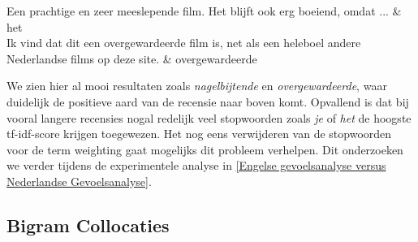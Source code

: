 \begin{table}[h]
\begin{tabu}
Een prachtige en zeer meeslepende film. Het blijft ook erg boeiend, omdat ... & het                                  \\ \hline
Ik vind dat dit een overgewardeerde film is, net als een heleboel andere Nederlandse films op deze site.                                                                                                                                                                                                                                                                                                                                                                                                                                                                                                                                                                                                                                                                                                                                                                                                                                                                                                                                                                                                                                                                                                                                                                                                                                                                                                                                                                                        & overgewardeerde                      \\ \hline
\end{tabu}
\end{table}


We zien hier al mooi resultaten zoals \textit{nagelbijtende} en \textit{overgewardeerde}, waar duidelijk de positieve aard van de recensie naar boven komt. Opvallend is dat bij vooral langere recensies nogal redelijk veel stopwoorden zoals \textit{je} of \textit{het} de hoogste tf-idf-score krijgen toegewezen. Het nog eens verwijderen van de stopwoorden voor de term weighting gaat mogelijks dit probleem verhelpen. Dit onderzoeken we verder tijdens de experimentele analyse in \ref{Engelse gevoelsanalyse versus Nederlandse Gevoelsanalyse}. 


\subsection{Bigram Collocaties}\label{Bigram Collocaties}

